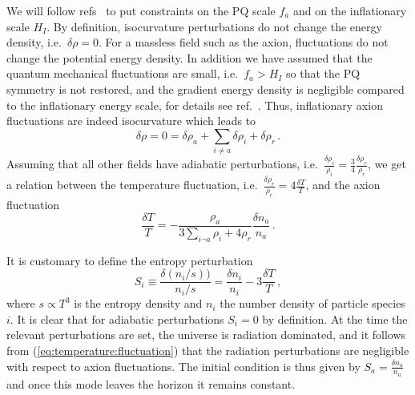 \documentclass[preprint,nofootinbib]{revtex4}
\begin{document}
We will follow refs~\cite{burns:axion:isocurvature,beltran:garcia-bellido:lesgourges:isocurvature,hertzberg:tegmark:wilczek:axion,hamann:hannestad:raffelt:wong:isocurvature,visinelli:gondolo:axion} to put constraints on the PQ scale $f_a$ and on the inflationary scale $H_I$. By definition, isocurvature perturbations do not change the energy density, i.e.\ $\delta \rho = 0$. For a massless field such as the axion, fluctuations do not change the potential energy density. In addition we have assumed that the quantum mechanical fluctuations are small, i.e.\ $f_a>H_I$ so that the PQ symmetry is not restored, and the gradient energy density is negligible compared to the inflationary energy scale, for details see ref.~\cite{beltran:garcia-bellido:lesgourges:isocurvature}. Thus, inflationary axion fluctuations are indeed isocurvature which leads to
\begin{equation}
 \delta \rho =0= \delta \rho_a + \sum_{i\neq a}\delta \rho_i + \delta \rho_r\,.
\end{equation}
Assuming that all other fields have adiabatic perturbations, i.e.\ $\frac{\delta \rho_i}{\rho_i} = \frac{3}{4} \frac{\delta \rho_r}{\rho_r}$, we get a relation between the temperature fluctuation, i.e.\ $\frac{\delta \rho_r}{\rho_r}=4\frac{\delta T}{T}$, and the axion fluctuation
\begin{equation}
 \frac{\delta T}{T}=-\frac{\rho_a}{3\sum_{i\neg a}\rho_i + 4 \rho_r} \frac{\delta n_a}{n_a}\,.\label{eq:temperature:fluctuation}
\end{equation}

It is customary to define the entropy perturbation
\begin{equation}
 S_i \equiv \frac{\delta(n_i/s))}{n_i/s}=\frac{\delta n_i}{n_i}-3\frac{\delta T}{T}\,,
\end{equation}
where $s\propto T^3$ is the entropy density and $n_i$ the number density of particle species $i$. It is clear that for adiabatic perturbations $S_i=0$ by definition. At the time the relevant perturbations are set, the universe is radiation dominated, and it follows from (\ref{eq:temperature:fluctuation}) that the radiation perturbations are negligible with respect to axion fluctuations. The initial condition is thus given by $S_a = \frac{\delta n_a}{n_a}$ and once this mode leaves the horizon it remains constant.
\end{document}
